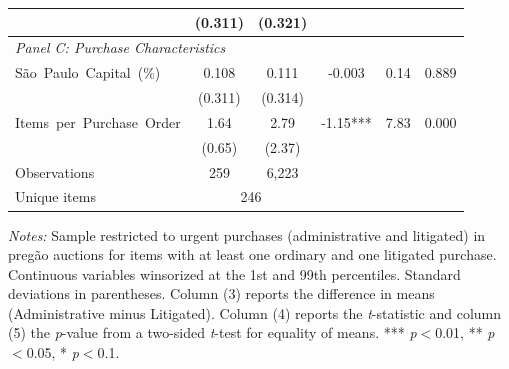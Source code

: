 \begin{table}[ht]
\begin{threeparttable}
\begin{tabular}{lccccc}
    & (0.311) & (0.321) & & & \\[3pt]
    \hline
    \multicolumn{6}{l}{\textit{Panel C: Purchase Characteristics}} \\[3pt]
    S\~ao~Paulo~Capital~(\%) & 0.108 & 0.111 & -0.003 & 0.14 & 0.889 \\
    & (0.311) & (0.314) & & & \\[3pt]
    Items~per~Purchase~Order & 1.64 & 2.79 & -1.15*** & 7.83 & 0.000 \\
    & (0.65) & (2.37) & & & \\[3pt]
    \hline
    Observations & 259 & 6,223 & & & \\
    Unique items & \multicolumn{2}{c}{246} & & & \\
    \hline\hline
  \end{tabular}
  \begin{tablenotes}
    \small
    \item \textit{Notes:} Sample restricted to urgent purchases (administrative and litigated) in preg\~ao auctions for items with at least one ordinary and one litigated purchase. Continuous variables winsorized at the 1st and 99th percentiles. Standard deviations in parentheses. Column (3) reports the difference in means (Administrative minus Litigated). Column (4) reports the \textit{t}-statistic and column (5) the \textit{p}-value from a two-sided \textit{t}-test for equality of means.
    *** \textit{p}$<$0.01, ** \textit{p}$<$0.05, * \textit{p}$<$0.1.
  \end{tablenotes}
  \end{threeparttable}
\end{table}
